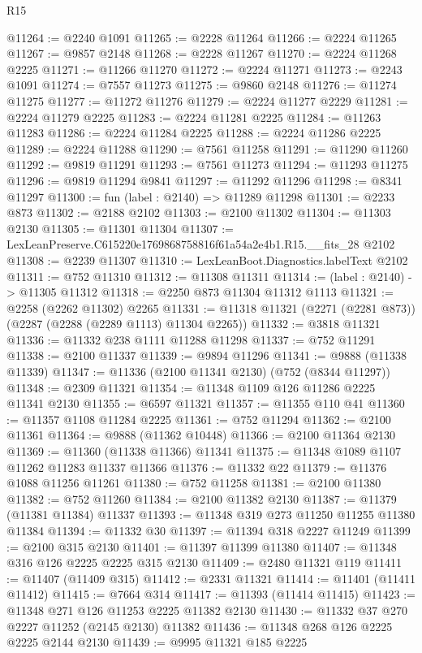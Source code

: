 \begin{lexlean}{R15}
\begin{coremodule}
@11264 := @2240 @1091
@11265 := @2228 @11264
@11266 := @2224 @11265
@11267 := @9857 @2148
@11268 := @2228 @11267
@11270 := @2224 @11268 @2225
@11271 := @11266 @11270
@11272 := @2224 @11271
@11273 := @2243 @1091
@11274 := @7557 @11273
@11275 := @9860 @2148
@11276 := @11274 @11275
@11277 := @11272 @11276
@11279 := @2224 @11277 @2229
@11281 := @2224 @11279 @2225
@11283 := @2224 @11281 @2225
@11284 := @11263 @11283
@11286 := @2224 @11284 @2225
@11288 := @2224 @11286 @2225
@11289 := @2224 @11288
@11290 := @7561 @11258
@11291 := @11290 @11260
@11292 := @9819 @11291
@11293 := @7561 @11273
@11294 := @11293 @11275
@11296 := @9819 @11294 @9841
@11297 := @11292 @11296
@11298 := @8341 @11297
@11300 := fun (label : @2140) => @11289 @11298
@11301 := @2233 @873
@11302 := @2188 @2102
@11303 := @2100 @11302
@11304 := @11303 @2130
@11305 := @11301 @11304
@11307 := LexLeanPreserve.C615220e1769868758816f61a54a2e4b1.R15.__fits_28 @2102
@11308 := @2239 @11307
@11310 := LexLeanBoot.Diagnostics.labelText @2102
@11311 := @752 @11310
@11312 := @11308 @11311
@11314 := (label : @2140) -> @11305 @11312
@11318 := @2250 @873 @11304 @11312 @1113
@11321 := @2258 (@2262 @11302) @2265
@11331 := @11318 @11321 (@2271 (@2281 @873)) (@2287 (@2288 (@2289 @1113) @11304 @2265))
@11332 := @3818 @11321
@11336 := @11332 @238 @1111 @11288 @11298
@11337 := @752 @11291
@11338 := @2100 @11337
@11339 := @9894 @11296
@11341 := @9888 (@11338 @11339)
@11347 := @11336 (@2100 @11341 @2130) (@752 (@8344 @11297))
@11348 := @2309 @11321
@11354 := @11348 @1109 @126 @11286 @2225 @11341 @2130
@11355 := @6597 @11321
@11357 := @11355 @110 @41
@11360 := @11357 @1108 @11284 @2225
@11361 := @752 @11294
@11362 := @2100 @11361
@11364 := @9888 (@11362 @10448)
@11366 := @2100 @11364 @2130
@11369 := @11360 (@11338 @11366) @11341
@11375 := @11348 @1089 @1107 @11262 @11283 @11337 @11366
@11376 := @11332 @22
@11379 := @11376 @1088 @11256 @11261
@11380 := @752 @11258
@11381 := @2100 @11380
@11382 := @752 @11260
@11384 := @2100 @11382 @2130
@11387 := @11379 (@11381 @11384) @11337
@11393 := @11348 @319 @273 @11250 @11255 @11380 @11384
@11394 := @11332 @30
@11397 := @11394 @318 @2227 @11249
@11399 := @2100 @315 @2130
@11401 := @11397 @11399 @11380
@11407 := @11348 @316 @126 @2225 @2225 @315 @2130
@11409 := @2480 @11321 @119
@11411 := @11407 (@11409 @315)
@11412 := @2331 @11321
@11414 := @11401 (@11411 @11412)
@11415 := @7664 @314
@11417 := @11393 (@11414 @11415)
@11423 := @11348 @271 @126 @11253 @2225 @11382 @2130
@11430 := @11332 @37 @270 @2227 @11252 (@2145 @2130) @11382
@11436 := @11348 @268 @126 @2225 @2225 @2144 @2130
@11439 := @9995 @11321 @185 @2225

\end{coremodule}
\end{lexlean}
